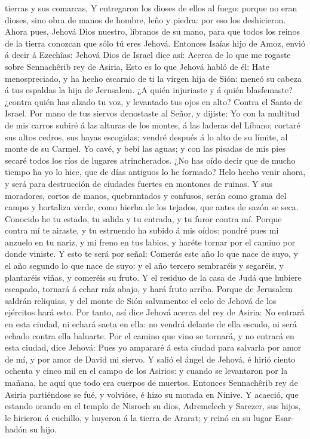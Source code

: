tierras y sus comarcas,  Y entregaron los dioses de ellos
al fuego: porque no eran dioses, sino obra de manos de hombre, leño y
piedra: por eso los deshicieron.  Ahora pues, Jehová Dios
nuestro, líbranos de su mano, para que todos los reinos de la tierra
conozcan que sólo tú eres Jehová.  Entonces Isaías hijo
de Amoz, envió á decir á Ezechîas: Jehová Dios de Israel dice así:
Acerca de lo que me rogaste sobre Sennachêrib rey de Asiria,
 Esto es lo que Jehová habló de él: Hate menospreciado, y
ha hecho escarnio de ti la virgen hija de Sión: meneó su cabeza á tus
espaldas la hija de Jerusalem.  ¿A quién injuriaste y á
quién blasfemaste? ¿contra quién has alzado tu voz, y levantado tus ojos
en alto? Contra el Santo de Israel.  Por mano de tus
siervos denostaste al Señor, y dijiste: Yo con la multitud de mis carros
subiré á las alturas de los montes, á las laderas del Líbano; cortaré
sus altos cedros, sus hayas escogidas; vendré después á lo alto de su
límite, al monte de su Carmel.  Yo cavé, y bebí las
aguas; y con las pisadas de mis pies secaré todos los ríos de lugares
atrincherados.  ¿No has oído decir que de mucho tiempo ha
yo lo hice, que de días antiguos lo he formado? Helo hecho venir ahora,
y será para destrucción de ciudades fuertes en montones de ruinas.
 Y sus moradores, cortos de manos, quebrantados y
confusos, serán como grama del campo y hortaliza verde, como hierba de
los tejados, que antes de sazón se seca.  Conocido he tu
estado, tu salida y tu entrada, y tu furor contra mí. 
Porque contra mí te airaste, y tu estruendo ha subido á mis oídos:
pondré pues mi anzuelo en tu nariz, y mi freno en tus labios, y haréte
tornar por el camino por donde viniste.  Y esto te será
por señal: Comerás este año lo que nace de suyo, y el año segundo lo que
nace de suyo: y el año tercero sembraréis y segaréis, y plantaréis
viñas, y comeréis su fruto.  Y el residuo de la casa de
Judá que hubiere escapado, tornará á echar raíz abajo, y hará fruto
arriba.  Porque de Jerusalem saldrán reliquias, y del
monte de Sión salvamento: el celo de Jehová de los ejércitos hará esto.
 Por tanto, así dice Jehová acerca del rey de Asiria: No
entrará en esta ciudad, ni echará saeta en ella: no vendrá delante de
ella escudo, ni será echado contra ella baluarte.  Por el
camino que vino se tornará, y no entrará en esta ciudad, dice Jehová:
 Pues yo ampararé á esta ciudad para salvarla por amor de
mí, y por amor de David mi siervo.  Y salió el ángel de
Jehová, é hirió ciento ochenta y cinco mil en el campo de los Asirios: y
cuando se levantaron por la mañana, he aquí que todo era cuerpos de
muertos.  Entonces Sennachêrib rey de Asiria partiéndose
se fué, y volvióse, é hizo su morada en Nínive.  Y
acaeció, que estando orando en el templo de Nisroch su dios, Adremelech
y Sarezer, sus hijos, le hirieron á cuchillo, y huyeron á la tierra de
Ararat; y reinó en su lugar Esar-hadón su hijo.

